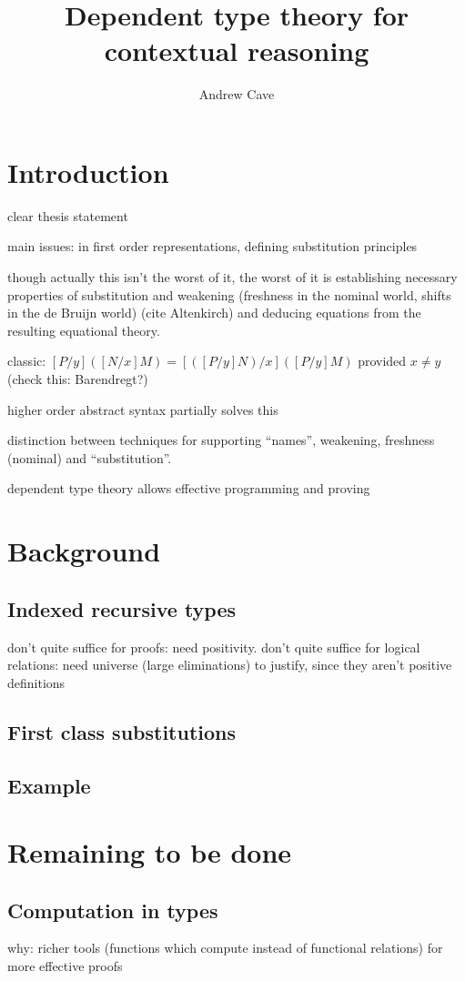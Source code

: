 \documentclass{article}
\author{Andrew Cave}
\title{Dependent type theory for contextual reasoning}
\begin{document}
\maketitle

\section{Introduction}
clear thesis statement

main issues:
in first order representations, defining substitution principles

though actually this isn't the worst of it, the worst of it is
establishing necessary properties of substitution and weakening
(freshness in the nominal world, shifts in the de Bruijn world) (cite
Altenkirch) and deducing equations from the resulting equational
theory.

classic: $[P/y]([N/x]M) = [([P/y]N)/x] ([P/y]M)$ provided $x\neq y$
(check this: Barendregt?)

higher order abstract syntax partially solves this

distinction between techniques for supporting ``names'', weakening, freshness (nominal) and ``substitution''.

dependent type theory allows effective programming and proving
\section{Background}
\subsection{Indexed recursive types}

don't quite suffice for proofs: need positivity. don't quite suffice
for logical relations: need universe (large eliminations) to justify,
since they aren't positive definitions
\subsection{First class substitutions}

\subsection{Example}
\section{Remaining to be done}
\subsection{Computation in types}
why: richer tools (functions which compute instead of functional
relations) for more effective proofs
\end{document}
